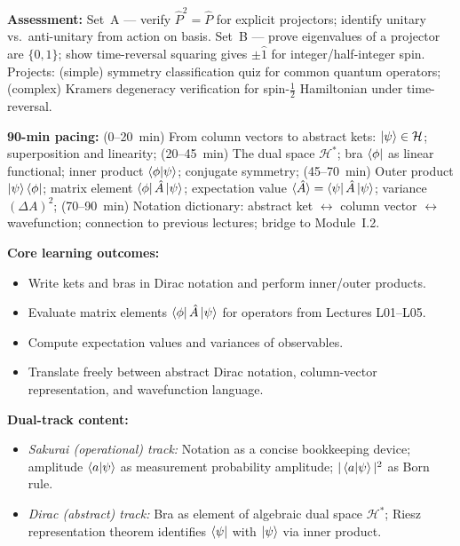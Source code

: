 \documentclass[11pt,a4paper]{article}
\begin{document}
\begin{tcolorbox}[modulebox, title={Module~I.1 --- Lecture L05: Types of Symmetry Operators and Wigner's Theorem}]
\medskip\textbf{Assessment:}
Set~A --- verify $\hat{P}^2=\hat{P}$ for explicit projectors; identify unitary vs.\ anti-unitary from action on basis.
Set~B --- prove eigenvalues of a projector are $\{0,1\}$; show time-reversal squaring gives $\pm\hat{1}$ for integer/half-integer spin.
Projects: (simple) symmetry classification quiz for common quantum operators;
(complex) Kramers degeneracy verification for spin-$\tfrac{1}{2}$ Hamiltonian under time-reversal.
\end{tcolorbox}

\medskip

\begin{tcolorbox}[modulebox, title={Module~I.1 --- Lecture L06: Bra-Ket Formalism (\S2.1--2.2)}]
\textbf{90-min pacing:} (0--20~min) From column vectors to abstract kets:
$\ket{\psi}\in\mathcal{H}$; superposition and linearity;
(20--45~min) The dual space $\mathcal{H}^*$; bra $\bra{\phi}$ as linear functional;
inner product $\braket{\phi|\psi}$; conjugate symmetry;
(45--70~min) Outer product $\ket{\psi}\bra{\phi}$; matrix element $\bra{\phi}\hat{A}\ket{\psi}$;
expectation value $\langle\hat{A}\rangle = \bra{\psi}\hat{A}\ket{\psi}$; variance $(\Delta A)^2$;
(70--90~min) Notation dictionary: abstract ket $\leftrightarrow$ column vector $\leftrightarrow$ wavefunction;
connection to previous lectures; bridge to Module~I.2.

\medskip\textbf{Core learning outcomes:}
\begin{itemize}[leftmargin=1.4em,topsep=2pt,itemsep=1pt]
  \item Write kets and bras in Dirac notation and perform inner/outer products.
  \item Evaluate matrix elements $\bra{\phi}\hat{A}\ket{\psi}$ for operators from Lectures L01--L05.
  \item Compute expectation values and variances of observables.
  \item Translate freely between abstract Dirac notation, column-vector representation, and wavefunction language.
\end{itemize}

\medskip\textbf{Dual-track content:}
\begin{itemize}[leftmargin=1.4em,topsep=2pt,itemsep=1pt]
  \item \textit{Sakurai (operational) track:} Notation as a concise bookkeeping device;
    amplitude $\braket{a|\psi}$ as measurement probability amplitude; $|\braket{a|\psi}|^2$ as Born rule.
  \item \textit{Dirac (abstract) track:} Bra as element of algebraic dual space $\mathcal{H}^*$;
    Riesz representation theorem identifies $\bra{\psi}$ with $\ket{\psi}$ via inner product.
\end{itemize}


\end{tcolorbox}
\end{document}
